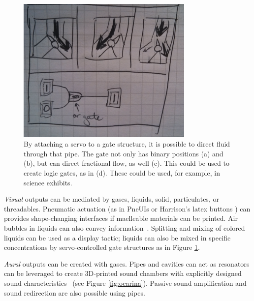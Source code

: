 \begin{figure}[h]
\centering
    \includegraphics[width=3.4in]{figures/placeholder/direct.jpg}
\caption{By attaching a servo to a gate structure, it is possible to direct fluid through that pipe.  The gate not only has binary positions (a) and (b), but can direct fractional flow, as well (c).  This could be used to create logic gates, as in (d).  These could be used, for example, in science exhibits. }
\label{fig:direct}
\end{figure}

\emph{Visual} outputs can be mediated by gases, liquids, solid, particulates, or threadables.  Pneumatic actuation (as in PneUIs \cite{Yao-pneui} or Harrison's latex buttons \cite{Harrison-buttons}) can provides shape-changing interfaces if maelleable materials can be printed. 
Air bubbles in liquids can also convey information~\cite{Heiner1999Percolator}. Splitting and mixing of colored liquids can be used as a display tactic; liquids can also be mixed in specific concentrations by servo-controlled gate structures as in Figure \ref{fig:direct}. %

\emph{Aural} outputs can be created with gases.  Pipes and cavities can act as resonators can be leveraged to create 3D-printed sound chambers with explicitly designed sound characteristics~\cite{Zoran-flute} (see Figure \ref{fig:ocarina}).  %
Passive sound amplification and sound redirection are also possible using pipes.


